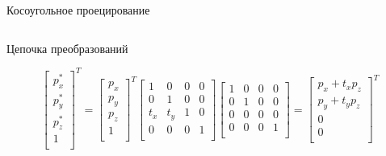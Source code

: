 \documentclass{beamer}
\begin{document}
\begin{frame}{Косоугольное проецирование}
{\[			\]
		\begin{center}
			Цепочка преобразований
		\end{center}
			\[
				\begin{bmatrix}
					p_x^* \\
					p_y^*	\\
					p_z^* \\
					1			\\
				\end{bmatrix}^T
				=
				\begin{bmatrix}
					p_x \\
					p_y	\\
					p_z \\
					1		\\
				\end{bmatrix}^T	
				\begin{bmatrix}
					1 & 0 & 0 & 0 \\
					0 & 1 & 0 & 0 \\
					t_x & t_y & 1 & 0 \\
					0 & 0 & 0 & 1 \\
				\end{bmatrix}
				\begin{bmatrix}
					1 & 0 & 0 & 0 \\
					0 & 1 & 0 & 0 \\
					0 & 0 & 0 & 0 \\
					0 & 0 & 0 & 1 \\
				\end{bmatrix}
				=
				\begin{bmatrix}
					p_x + t_x p_z \\
					p_y + t_y p_z \\
					0 \\
					0	\\
				\end{bmatrix}^T
			\]
					
		}
	\end{frame}
\end{document}
